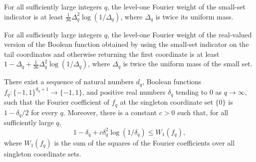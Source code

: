 \begin{theorem}
\label{FABL.eventually_fknOptimalityGain}
\leanok
{}
For all sufficiently large integers $q$, the level-one Fourier weight of the small-set
indicator is at least $\frac{1}{36}\Delta_q^2\log(1/\Delta_q)$, where $\Delta_q$ is
twice its uniform mass.
\end{theorem}

\begin{theorem}
\label{FABL.eventually_fourierWeightAtLevel_one_fknOptimalityFunction_lower}
\leanok
{}
For all sufficiently large integers $q$, the level-one Fourier weight of the real-valued
version of the Boolean function obtained by using the small-set indicator on the tail
coordinates and otherwise returning the first coordinate is at least
$1-\Delta_q+\frac{1}{36}\Delta_q^2\log(1/\Delta_q)$, where $\Delta_q$ is twice the
uniform mass of the small set.
\end{theorem}

\begin{theorem}
\label{FABL.exercise5_36}
\leanok
{}
There exist a sequence of natural numbers $d_q$, Boolean functions
$f_q:\{-1,1\}^{d_q+1}\to\{-1,1\}$, and positive real numbers $\delta_q$ tending to $0$
as $q\to\infty$, such that the Fourier coefficient of $f_q$ at the singleton coordinate
set $\{0\}$ is $1-\delta_q/2$ for every $q$. Moreover, there is a constant $c>0$ such
that, for all sufficiently large $q$,
\[
1-\delta_q+c\delta_q^2\log(1/\delta_q)\le W_1(f_q),
\]
where $W_1(f_q)$ is the sum of the squares of the Fourier coefficients over all
singleton coordinate sets.
\end{theorem}

